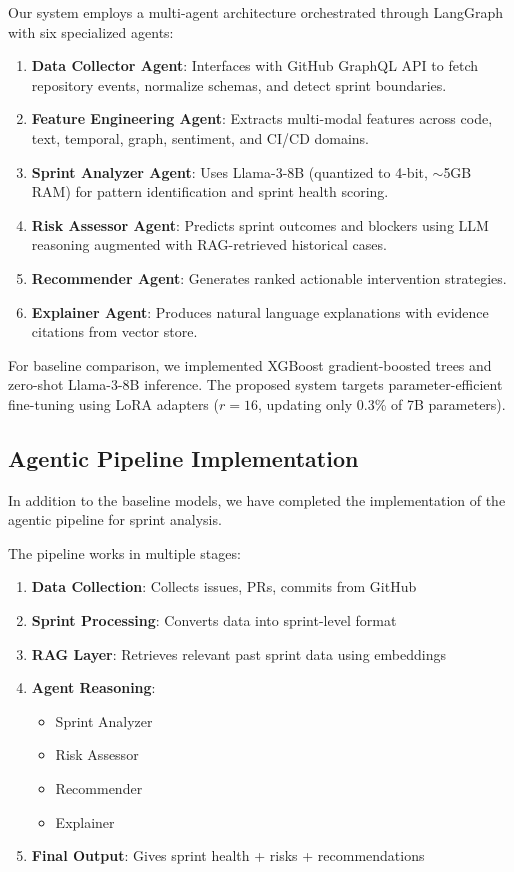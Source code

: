\documentclass[journal]{IEEEtran}
\begin{document}
Our system employs a multi-agent architecture orchestrated through LangGraph with six specialized agents:

\begin{enumerate}
    \item \textbf{Data Collector Agent}: Interfaces with GitHub GraphQL API to fetch repository events, normalize schemas, and detect sprint boundaries.
    \item \textbf{Feature Engineering Agent}: Extracts multi-modal features across code, text, temporal, graph, sentiment, and CI/CD domains.
    \item \textbf{Sprint Analyzer Agent}: Uses Llama-3-8B (quantized to 4-bit, $\sim$5GB RAM) for pattern identification and sprint health scoring.
    \item \textbf{Risk Assessor Agent}: Predicts sprint outcomes and blockers using LLM reasoning augmented with RAG-retrieved historical cases.
    \item \textbf{Recommender Agent}: Generates ranked actionable intervention strategies.
    \item \textbf{Explainer Agent}: Produces natural language explanations with evidence citations from vector store.
\end{enumerate}

For baseline comparison, we implemented XGBoost gradient-boosted trees and zero-shot Llama-3-8B inference. The proposed system targets parameter-efficient fine-tuning using LoRA adapters ($r=16$, updating only 0.3\% of 7B parameters).


\subsection{Agentic Pipeline Implementation}

In addition to the baseline models, we have completed the implementation of the agentic pipeline for sprint analysis.

The pipeline works in multiple stages:

\begin{enumerate}
    \item \textbf{Data Collection}: Collects issues, PRs, commits from GitHub
    \item \textbf{Sprint Processing}: Converts data into sprint-level format
    \item \textbf{RAG Layer}: Retrieves relevant past sprint data using embeddings
    \item \textbf{Agent Reasoning}:
    \begin{itemize}
        \item Sprint Analyzer
        \item Risk Assessor
        \item Recommender
        \item Explainer
    \end{itemize}
    \item \textbf{Final Output}: Gives sprint health + risks + recommendations
\end{enumerate}
\end{document}
